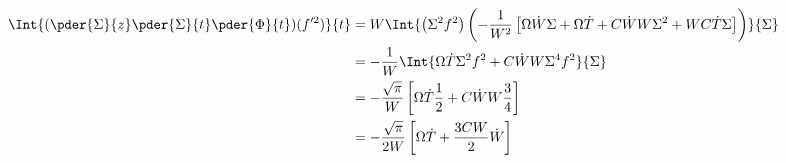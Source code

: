 \begin{equation}
\begin{split}
\Int{ (\pder{\Sigma}{z} \pder{\Sigma}{t} \pder{\Phi}{t})(f'^2) }{t}  &= W \Int{\left(\Sigma^2 f^2\right) \left(-\frac{1}{W^2}\left[\Omega \dot{W} \Sigma  + \Omega \dot{T} + C \dot{W} W \Sigma^2  + W C \dot{T} \Sigma  \right]  \right)}{\Sigma}\\
 &= -\frac{1}{W} \Int{\Omega \dot{T} \Sigma^2 f^2 + C \dot{W} W \Sigma^4 f^2}{\Sigma}\\
 &= -\frac{\sqrt{\pi}}{W} \left[\Omega \dot{T} \frac{1}{2} + C \dot{W} W \frac{3}{4}\right]\\
 &= -\frac{\sqrt{\pi}}{2W} \left[\Omega \dot{T}+ \frac{3C W }{2}\dot{W} \right]\\
\end{split}
\end{equation}

